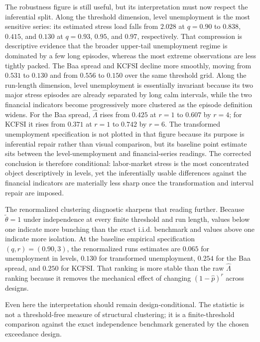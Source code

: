 \documentclass[11pt]{article}
\begin{document}
The robustness figure is still useful, but its interpretation must now respect the inferential split. Along the threshold dimension, level unemployment is the most sensitive series: its estimated stress load falls from $2.028$ at $q=0.90$ to $0.838$, $0.415$, and $0.130$ at $q=0.93$, $0.95$, and $0.97$, respectively. That compression is descriptive evidence that the broader upper-tail unemployment regime is dominated by a few long episodes, whereas the most extreme observations are less tightly packed. The Baa spread and KCFSI decline more smoothly, moving from $0.531$ to $0.130$ and from $0.556$ to $0.150$ over the same threshold grid. Along the run-length dimension, level unemployment is essentially invariant because its two major stress episodes are already separated by long calm intervals, while the two financial indicators become progressively more clustered as the episode definition widens. For the Baa spread, $\widehat{\Lambda}$ rises from $0.425$ at $r=1$ to $0.607$ by $r=4$; for KCFSI it rises from $0.371$ at $r=1$ to $0.742$ by $r=6$. The transformed unemployment specification is not plotted in that figure because its purpose is inferential repair rather than visual comparison, but its baseline point estimate sits between the level-unemployment and financial-series readings. The corrected conclusion is therefore conditional: labor-market stress is the most concentrated object descriptively in levels, yet the inferentially usable differences against the financial indicators are materially less sharp once the transformation and interval repair are imposed.

The renormalized clustering diagnostic sharpens that reading further. Because $\widetilde{\theta}=1$ under independence at every finite threshold and run length, values below one indicate more bunching than the exact i.i.d. benchmark and values above one indicate more isolation. At the baseline empirical specification $(q,r)=(0.90,3)$, the renormalized runs estimates are $0.065$ for unemployment in levels, $0.130$ for transformed unemployment, $0.254$ for the Baa spread, and $0.250$ for KCFSI. That ranking is more stable than the raw $\widehat{\Lambda}$ ranking because it removes the mechanical effect of changing $(1-\widehat{p})^r$ across designs.

Even here the interpretation should remain design-conditional. The statistic is not a threshold-free measure of structural clustering; it is a finite-threshold comparison against the exact independence benchmark generated by the chosen exceedance design.
\end{document}
